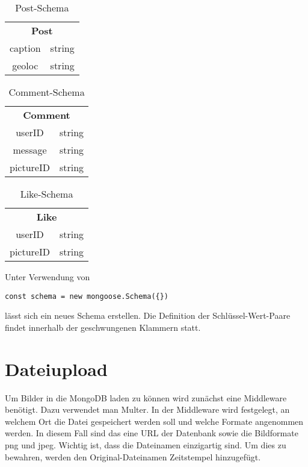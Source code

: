 \begin{table}[!htb]
\begin{tabularx}{\textwidth}{|c|c|}
    \cline{1-2}
    \multicolumn{2}{c}{\textbf{Post}}\\
    \cline{1-2}
    caption & string\\
    \cline{1-2}
    geoloc & string\\
    \cline{1-2}
\end{tabularx}
\caption{Post-Schema}
\label{postschema}
\end{table}

\begin{table}[!htb]
\begin{tabularx}{\textwidth}{|c|c|}
    \cline{1-2}
    \multicolumn{2}{c}{\textbf{Comment}}\\
    \cline{1-2}
    userID & string\\
    \cline{1-2}
    message & string\\
    \cline{1-2}
    pictureID & string\\
    \cline{1-2}
\end{tabularx}
\caption{Comment-Schema}
\label{commentschema}
\end{table}

\begin{table}[!htb]
\begin{tabularx}{\textwidth}{|c|c|}
    \cline{1-2}
    \multicolumn{2}{c}{\textbf{Like}}\\
    \cline{1-2}
    userID & string\\
    \cline{1-2}
    pictureID & string\\
    \cline{1-2}
\end{tabularx}
\caption{Like-Schema}
\label{likeschema}
\end{table}

Unter Verwendung von 

\begin{lstlisting}[caption=Erstellen eines neuen Schemas, label=lst:schema]
    const schema = new mongoose.Schema({})
\end{lstlisting}

lässt sich ein neues Schema erstellen. Die Definition der Schlüssel-Wert-Paare findet innerhalb der geschwungenen Klammern statt.

\section{Dateiupload}
Um Bilder in die MongoDB laden zu können wird zunächst eine Middleware benötigt. Dazu verwendet man Multer. In der Middleware wird festgelegt, an welchem Ort die Datei gespeichert werden soll und welche Formate angenommen werden. In diesem Fall sind das eine URL der Datenbank sowie die Bildformate png und jpeg. Wichtig ist, dass die Dateinamen einzigartig sind. Um dies zu bewahren, werden den Original-Dateinamen Zeitstempel hinzugefügt.

